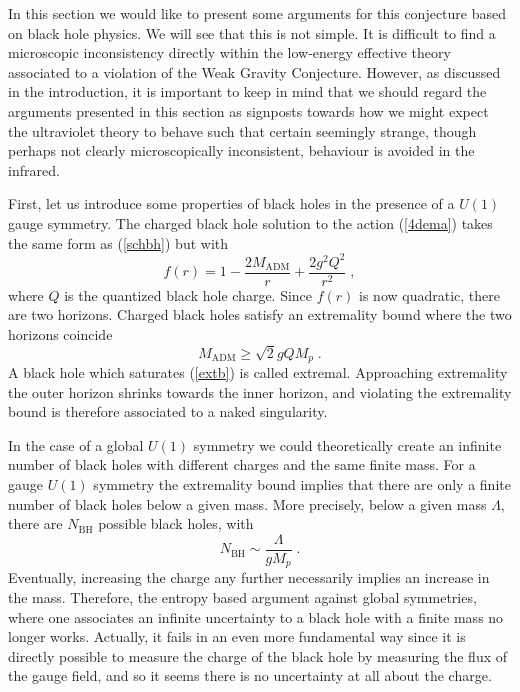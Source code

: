 \documentclass[11pt,a4paper]{article}
\numberwithin{equation}{section}
\numberwithin{table}{section}\setlength{\multlinegap}{25pt}
\newcommand{\be}{\begin{equation}}
\newcommand{\ee}{\end{equation}}
\begin{document}
In this section we would like to present some arguments for this conjecture based on black hole physics. We will see that this is not simple. It is difficult to find a microscopic inconsistency directly within the low-energy effective theory associated to a violation of the Weak Gravity Conjecture. However, as discussed in the introduction, it is important to keep in mind that we should regard the arguments presented in this section as signposts towards how we might expect the ultraviolet theory to behave such that certain seemingly strange, though perhaps not clearly microscopically inconsistent, behaviour is avoided in the infrared. 

First, let us introduce some properties of black holes in the presence of a $U(1)$ gauge symmetry. The charged black hole solution to the action (\ref{4dema}) takes the same form as (\ref{schbh}) but with
\be
f\left(r\right) = 1 - \frac{2 M_{\mathrm{ADM}}}{r} + \frac{2g^2 Q^2}{r^2} \;,
\ee
where $Q$ is the quantized black hole charge. Since $f(r)$ is now quadratic, there are two horizons. Charged black holes satisfy an extremality bound where the two horizons coincide
\be
\label{extb}
M_{\mathrm{ADM}} \geq \sqrt{2} g Q M_p \;.
\ee
A black hole which saturates (\ref{extb}) is called extremal. Approaching extremality the outer horizon shrinks towards the inner horizon, and violating the extremality bound is therefore associated to a naked singularity. 

In the case of a global $U(1)$ symmetry we could theoretically create an infinite number of black holes with different charges and the same finite mass. For a gauge $U(1)$ symmetry the extremality bound implies that there are only a finite number of black holes below a given mass. More precisely, below a given mass $\Lambda$, there are $N_{\mathrm{BH}}$ possible black holes, with
\be
\label{nbh}
N_{\mathrm{BH}} \sim \frac{\Lambda}{g M_p} \;.
\ee
Eventually, increasing the charge any further necessarily implies an increase in the mass. Therefore, the entropy based argument against global symmetries, where one associates an infinite uncertainty to a black hole with a finite mass no longer works. Actually, it fails in an even more fundamental way since it is directly possible to measure the charge of the black hole by measuring the flux of the gauge field, and so it seems there is no uncertainty at all about the charge. 
\end{document}

